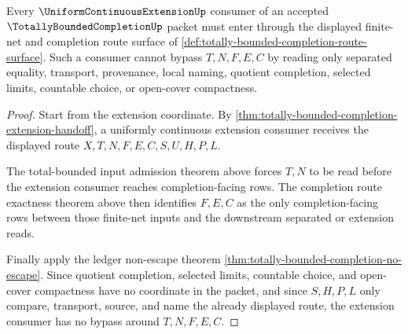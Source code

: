 \begin{theorem}
\label{thm:totally-bounded-completion-extension-consumer-boundary}
Every $\UniformContinuousExtensionUp$ consumer of an accepted $\TotallyBoundedCompletionUp$ packet must enter through the displayed finite-net and completion route surface of \autoref{def:totally-bounded-completion-route-surface}. Such a consumer cannot bypass $T,N,F,E,C$ by reading only separated equality, transport, provenance, local naming, quotient completion, selected limits, countable choice, or open-cover compactness.
\end{theorem}
\begin{proof}
Start from the extension coordinate. By \autoref{thm:totally-bounded-completion-extension-handoff}, a uniformly continuous extension consumer receives the displayed route $X,T,N,F,E,C,S,U,H,P,L$.

The total-bounded input admission theorem above forces $T,N$ to be read before the extension consumer reaches completion-facing rows. The completion route exactness theorem above then identifies $F,E,C$ as the only completion-facing rows between those finite-net inputs and the downstream separated or extension reads.

Finally apply the ledger non-escape theorem \autoref{thm:totally-bounded-completion-no-escape}. Since quotient completion, selected limits, countable choice, and open-cover compactness have no coordinate in the packet, and since $S,H,P,L$ only compare, transport, source, and name the already displayed route, the extension consumer has no bypass around $T,N,F,E,C$.
\end{proof}

